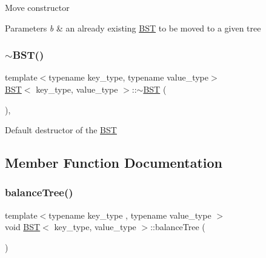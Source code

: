 Move constructor 
\begin{DoxyParams}{Parameters}
{\em b} & an already existing \mbox{\hyperlink{class_b_s_t}{B\+ST}} to be moved to a given tree \\
\hline
\end{DoxyParams}
\mbox{\label{class_b_s_t_aff56473bdcfa7353c0a75415b297e0f2}} 
\subsubsection{\texorpdfstring{$\sim$BST()}{~BST()}}
{\footnotesize\ttfamily template$<$typename key\+\_\+type, typename value\+\_\+type$>$ \\
\mbox{\hyperlink{class_b_s_t}{B\+ST}}$<$ key\+\_\+type, value\+\_\+type $>$\+::$\sim$\mbox{\hyperlink{class_b_s_t}{B\+ST}} (\begin{DoxyParamCaption}{ }\end{DoxyParamCaption})\hspace{0.3cm}{\ttfamily [default]}, {\ttfamily [noexcept]}}

Default destructor of the \mbox{\hyperlink{class_b_s_t}{B\+ST}} 

\subsection{Member Function Documentation}
\mbox{\label{class_b_s_t_af8ffbeddf32425dba94b9ea1bc4b3ee7}} 
\subsubsection{\texorpdfstring{balanceTree()}{balanceTree()}}
{\footnotesize\ttfamily template$<$typename key\+\_\+type , typename value\+\_\+type $>$ \\
void \mbox{\hyperlink{class_b_s_t}{B\+ST}}$<$ key\+\_\+type, value\+\_\+type $>$\+::balance\+Tree (\begin{DoxyParamCaption}{ }\end{DoxyParamCaption})}

